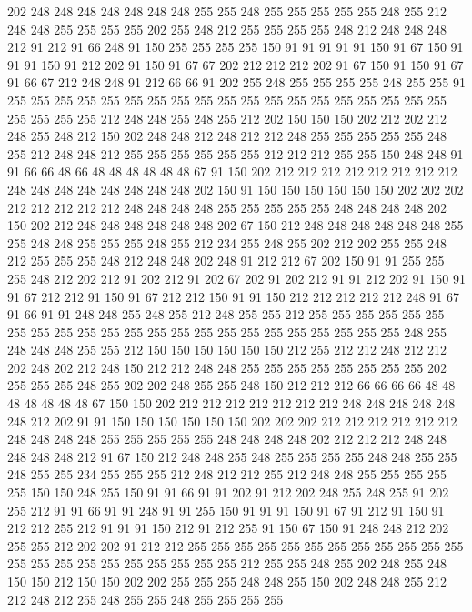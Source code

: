 202 248 248 248 248 248 248 248 255 255 248 255 255 255 255 255 248 255 212 248
248 255 255 255 255 202 255 248 212 255 255 255 255 248 212 248 248 248 212 91
212 91 66 248 91 150 255 255 255 255 150 91 91 91 91 91 150 91 67 150
91 91 91 150 91 212 202 91 150 91 67 67 202 212 212 212 202 91 67 150
91 150 91 67 91 66 67 212 248 248 91 212 66 66 91 202 255 248 255 255
255 255 248 255 255 91 255 255 255 255 255 255 255 255 255 255 255 255 255 255
255 255 255 255 255 255 255 255 255 212 248 248 255 248 255 212 202 150 150 150
202 212 202 212 248 255 248 212 150 202 248 248 212 248 212 212 248 255 255 255
255 255 248 255 212 248 248 212 255 255 255 255 255 255 212 212 212 255 255 150
248 248 91 91 66 66 48 66 48 48 48 48 48 48 67 91 150 202 212 212
212 212 212 212 212 212 248 248 248 248 248 248 248 248 202 150 91 150 150 150
150 150 150 202 202 202 212 212 212 212 212 248 248 248 248 255 255 255 255 255
248 248 248 248 202 150 202 212 248 248 248 248 248 248 202 67 150 212 248 248
248 248 248 248 255 255 248 248 255 255 255 248 255 212 234 255 248 255 202 212
202 255 255 248 212 255 255 255 248 212 248 248 202 248 91 212 212 67 202 150
91 91 255 255 255 248 212 202 212 91 202 212 91 202 67 202 91 202 212 91
91 212 202 91 150 91 91 67 212 212 91 150 91 67 212 212 150 91 91 150
212 212 212 212 212 248 91 67 91 66 91 91 248 248 255 248 255 212 248 255
255 212 255 255 255 255 255 255 255 255 255 255 255 255 255 255 255 255 255 255
255 255 255 255 255 248 255 248 248 248 255 255 212 150 150 150 150 150 150 212
255 212 212 248 212 212 202 248 202 212 248 150 212 212 248 248 255 255 255 255
255 255 255 255 202 255 255 255 248 255 202 202 248 255 255 248 150 212 212 212
66 66 66 66 48 48 48 48 48 48 48 67 150 150 202 212 212 212 212 212
212 212 248 248 248 248 248 248 212 202 91 91 150 150 150 150 150 150 202 202
202 212 212 212 212 212 212 248 248 248 248 255 255 255 255 255 248 248 248 248
202 212 212 212 248 248 248 248 248 212 91 67 150 212 248 248 255 248 255 255
255 255 248 248 255 255 248 255 255 234 255 255 255 212 248 212 212 255 212 248
248 255 255 255 255 255 150 150 248 255 150 91 91 66 91 91 202 91 212 202
248 255 248 255 91 202 255 212 91 91 66 91 91 248 91 91 255 150 91 91
91 150 91 67 91 212 91 150 91 212 212 255 212 91 91 91 150 212 91 212
255 91 150 67 150 91 248 248 212 202 255 255 212 202 202 91 212 212 255 255
255 255 255 255 255 255 255 255 255 255 255 255 255 255 255 255 255 255 255 255
212 255 255 248 255 202 248 255 248 150 150 212 150 150 202 202 255 255 255 248
248 255 150 202 248 248 255 212 212 248 212 255 248 255 255 248 255 255 255 255
